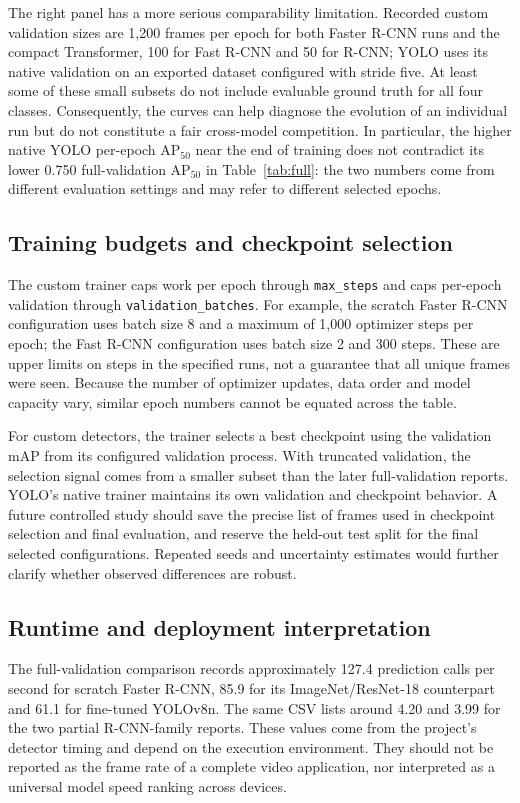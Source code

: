 The right panel has a more serious comparability limitation. Recorded custom validation sizes are 1,200 frames per epoch for both Faster R-CNN runs and the compact Transformer, 100 for Fast R-CNN and 50 for R-CNN; YOLO uses its native validation on an exported dataset configured with stride five. At least some of these small subsets do not include evaluable ground truth for all four classes. Consequently, the curves can help diagnose the evolution of an individual run but do not constitute a fair cross-model competition. In particular, the higher native YOLO per-epoch AP$_{50}$ near the end of training does not contradict its lower 0.750 full-validation AP$_{50}$ in Table~\ref{tab:full}: the two numbers come from different evaluation settings and may refer to different selected epochs.

\subsection{Training budgets and checkpoint selection}
The custom trainer caps work per epoch through \texttt{max\_steps} and caps per-epoch validation through \texttt{validation\_batches}. For example, the scratch Faster R-CNN configuration uses batch size 8 and a maximum of 1,000 optimizer steps per epoch; the Fast R-CNN configuration uses batch size 2 and 300 steps. These are upper limits on steps in the specified runs, not a guarantee that all unique frames were seen. Because the number of optimizer updates, data order and model capacity vary, similar epoch numbers cannot be equated across the table.

For custom detectors, the trainer selects a best checkpoint using the validation mAP from its configured validation process. With truncated validation, the selection signal comes from a smaller subset than the later full-validation reports. YOLO's native trainer maintains its own validation and checkpoint behavior. A future controlled study should save the precise list of frames used in checkpoint selection and final evaluation, and reserve the held-out test split for the final selected configurations. Repeated seeds and uncertainty estimates would further clarify whether observed differences are robust.

\subsection{Runtime and deployment interpretation}
The full-validation comparison records approximately 127.4 prediction calls per second for scratch Faster R-CNN, 85.9 for its ImageNet/ResNet-18 counterpart and 61.1 for fine-tuned YOLOv8n. The same CSV lists around 4.20 and 3.99 for the two partial R-CNN-family reports. These values come from the project's detector timing and depend on the execution environment. They should not be reported as the frame rate of a complete video application, nor interpreted as a universal model speed ranking across devices.

